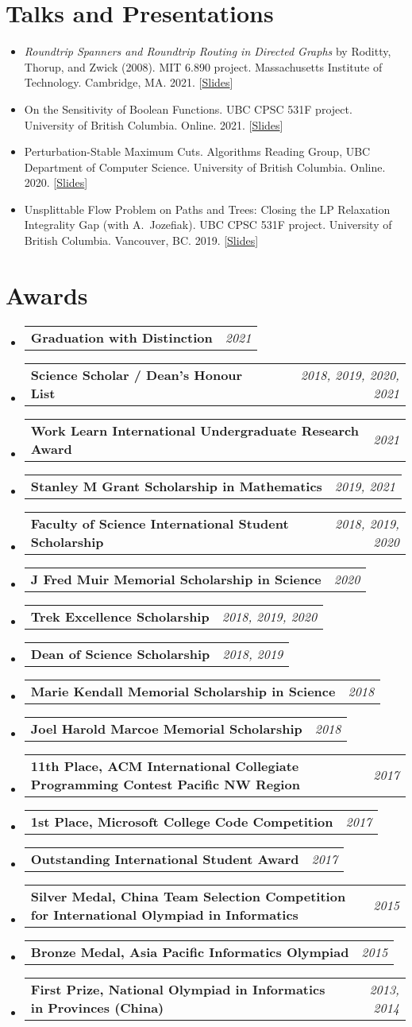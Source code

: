 \documentclass[letterpaper,11pt]{article}
\makeatletter
\newcommand{\manuscriptItem}[1]{
  \item #1 \vspace{-7pt}
}
\newcommand{\awardSubItem}[2]{
  \item
    \begin{tabular*}{0.97\textwidth}{l@{\extracolsep{\fill}}r}
      \textbf{\small #1} & \textit{\small #2} \\
    \end{tabular*}\vspace{-8pt}
}
\newcommand{\resumeSubHeadingListStart}{\begin{itemize}[leftmargin=*]}
\newcommand{\resumeSubHeadingListEnd}{\end{itemize}}
\makeatother
\begin{document}
\section{Talks and Presentations}
\resumeSubHeadingListStart
  \manuscriptItem{\emph{Roundtrip Spanners and Roundtrip Routing in Directed Graphs} by Roditty, Thorup, and Zwick (2008). MIT 6.890 project. Massachusetts Institute of Technology.
  Cambridge, MA. 2021. [\href{https://ypan.me/docs/roundtrip-slides.pdf}{Slides}]}
  \manuscriptItem{On the Sensitivity of Boolean Functions. UBC CPSC 531F project. University of
  British Columbia. Online. 2021. [\href{https://ypan.me/docs/sensitivity-slides.pdf}{Slides}]}
  \manuscriptItem{Perturbation-Stable Maximum Cuts. Algorithms Reading Group, UBC Department of Computer
  Science. University of British Columbia. Online. 2020. [\href{https://ypan.me/docs/maxcut.pdf}{Slides}]}
  \manuscriptItem{Unsplittable Flow Problem on Paths and Trees: Closing the LP Relaxation Integrality Gap (with A.\ Jozefiak). UBC CPSC 531F project. University of British
  Columbia. Vancouver, BC. 2019. [\href{https://ypan.me/docs/ufp-slides.pdf}{Slides}]}
\resumeSubHeadingListEnd

\section{Awards}
  \resumeSubHeadingListStart
    \awardSubItem{Graduation with Distinction}{2021}
    \awardSubItem{Science Scholar / Dean's Honour List}{2018, 2019, 2020, 2021}
    \awardSubItem{Work Learn International Undergraduate Research Award}{2021}
    \awardSubItem{Stanley M Grant Scholarship in Mathematics}{2019, 2021}
    \awardSubItem{Faculty of Science International Student Scholarship}{2018, 2019, 2020}
    \awardSubItem{J Fred Muir Memorial Scholarship in Science}{2020}
    \awardSubItem{Trek Excellence Scholarship}{2018, 2019, 2020}
    \awardSubItem{Dean of Science Scholarship}{2018, 2019}
    \awardSubItem{Marie Kendall Memorial Scholarship in Science}{2018}
    \awardSubItem{Joel Harold Marcoe Memorial Scholarship}{2018}
    \awardSubItem{11th Place, ACM International Collegiate Programming Contest Pacific NW Region}{2017}
    \awardSubItem{1st Place, Microsoft College Code Competition}{2017}
    \awardSubItem{Outstanding International Student Award}{2017}
    \awardSubItem{Silver Medal, China Team Selection Competition for International Olympiad in Informatics}{2015}
    \awardSubItem{Bronze Medal, Asia Pacific Informatics Olympiad}{2015}
    \awardSubItem{First Prize, National Olympiad in Informatics in Provinces (China)}{2013, 2014}
  \resumeSubHeadingListEnd
\end{document}
